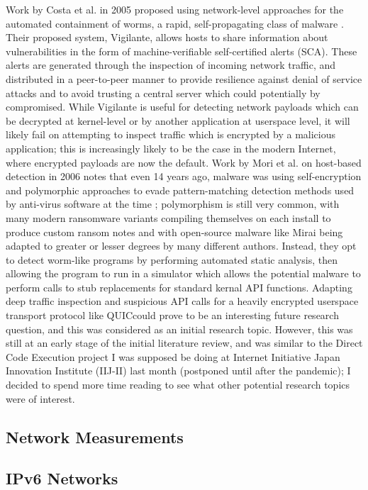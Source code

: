 \documentclass[10pt,sigconf]{acmart}
\begin{document}
Work by Costa et al. in 2005 proposed using network-level approaches for the automated containment of worms, a rapid, self-propagating class of malware \cite{costa2005}.
Their proposed system, Vigilante, allows hosts to share information about vulnerabilities in the form of machine-verifiable self-certified alerts (SCA).
These alerts are generated through the inspection of incoming network traffic, and distributed in a peer-to-peer manner to provide resilience against denial of service attacks and to avoid trusting a central server which could potentially by compromised.
While Vigilante is useful for detecting network payloads which can be decrypted at kernel-level or by another application at userspace level, it will likely fail on attempting to inspect traffic which is encrypted by a malicious application;
this is increasingly likely to be the case in the modern Internet, where encrypted payloads are now the default.
Work by Mori et al. on host-based detection in 2006 notes that even 14 years ago, malware was using self-encryption and polymorphic approaches to evade pattern-matching detection methods used by anti-virus software at the time \cite{mori2006};
polymorphism is still very common, with many modern ransomware variants compiling themselves on each install to produce custom ransom notes and with open-source malware like Mirai being adapted to greater or lesser degrees by many different authors.
Instead, they opt to detect worm-like programs by performing automated static analysis, then allowing the program to run in a simulator which allows the potential malware to perform calls to stub replacements for standard kernal API functions.
Adapting deep traffic inspection and suspicious API calls for a heavily encrypted userspace transport protocol like QUICcould prove to be an interesting future research question, and this was considered as an initial research topic.
However, this was still at an early stage of the initial literature review, and was similar to the Direct Code Execution \cite{tazaki2013} project I was supposed be doing at Internet Initiative Japan Innovation Institute (IIJ-II) last month (postponed until after the pandemic);
I decided to spend more time reading to see what other potential research topics were of interest.

\subsection{Network Measurements}
\label{network-measurements}

\subsection{IPv6 Networks}
\label{ipv6-reading}
\end{document}
